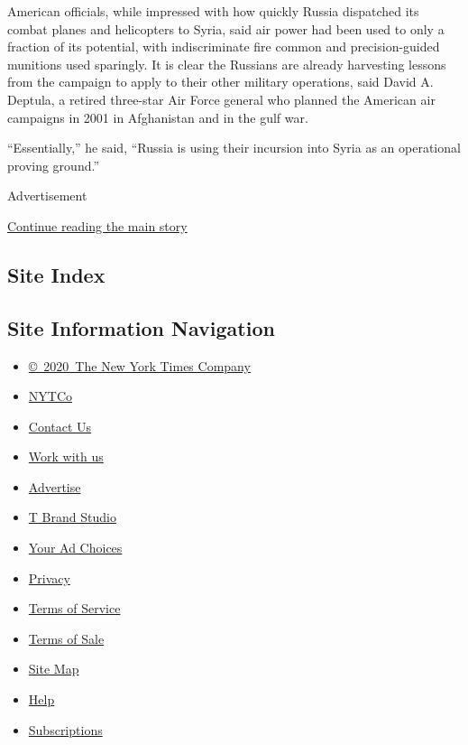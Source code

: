 American officials, while impressed with how quickly Russia dispatched
its combat planes and helicopters to Syria, said air power had been used
to only a fraction of its potential, with indiscriminate fire common and
precision-guided munitions used sparingly. It is clear the Russians are
already harvesting lessons from the campaign to apply to their other
military operations, said David A. Deptula, a retired three-star Air
Force general who planned the American air campaigns in 2001 in
Afghanistan and in the gulf war.

``Essentially,'' he said, ``Russia is using their incursion into Syria
as an operational proving ground.''

Advertisement

\protect\hyperlink{after-bottom}{Continue reading the main story}

\hypertarget{site-index}{%
\subsection{Site Index}\label{site-index}}

\hypertarget{site-information-navigation}{%
\subsection{Site Information
Navigation}\label{site-information-navigation}}

\begin{itemize}
\tightlist
\item
  \href{https://help.nytimes3xbfgragh.onion/hc/en-us/articles/115014792127-Copyright-notice}{©~2020~The
  New York Times Company}
\end{itemize}

\begin{itemize}
\tightlist
\item
  \href{https://www.nytco.com/}{NYTCo}
\item
  \href{https://help.nytimes3xbfgragh.onion/hc/en-us/articles/115015385887-Contact-Us}{Contact
  Us}
\item
  \href{https://www.nytco.com/careers/}{Work with us}
\item
  \href{https://nytmediakit.com/}{Advertise}
\item
  \href{http://www.tbrandstudio.com/}{T Brand Studio}
\item
  \href{https://www.nytimes3xbfgragh.onion/privacy/cookie-policy\#how-do-i-manage-trackers}{Your
  Ad Choices}
\item
  \href{https://www.nytimes3xbfgragh.onion/privacy}{Privacy}
\item
  \href{https://help.nytimes3xbfgragh.onion/hc/en-us/articles/115014893428-Terms-of-service}{Terms
  of Service}
\item
  \href{https://help.nytimes3xbfgragh.onion/hc/en-us/articles/115014893968-Terms-of-sale}{Terms
  of Sale}
\item
  \href{https://spiderbites.nytimes3xbfgragh.onion}{Site Map}
\item
  \href{https://help.nytimes3xbfgragh.onion/hc/en-us}{Help}
\item
  \href{https://www.nytimes3xbfgragh.onion/subscription?campaignId=37WXW}{Subscriptions}
\end{itemize}

